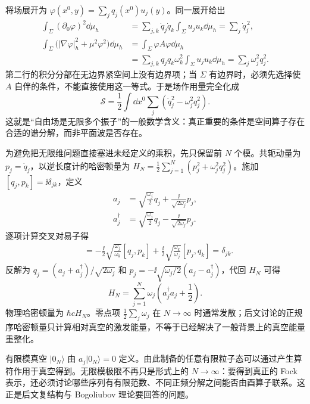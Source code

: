 将场展开为 $\varphi(x^0,y)=\sum_jq_j(x^0)u_j(y)$。同一展开给出
\begin{align*}
 \int_\Sigma(\partial_0\varphi)^2\dd\mu_h
 &=\sum_{j,k}\dot q_j\dot q_k\int_\Sigma u_ju_k\dd\mu_h
 =\sum_j\dot q_j^{\,2},\\
 \int_\Sigma\bigl(|\nabla\varphi|_h^2+\mu^2\varphi^2\bigr)\dd\mu_h
 &=\int_\Sigma\varphi A\varphi\dd\mu_h\\
 &=\sum_{j,k}q_jq_k\omega_k^2\int_\Sigma u_ju_k\dd\mu_h
 =\sum_j\omega_j^2q_j^2.
\end{align*}
第二行的积分分部在无边界紧空间上没有边界项；当 $\Sigma$ 有边界时，必须先选择使 $A$ 自伴的条件，不能直接使用这一等式。于是场作用量完全化成
\begin{equation}\label{eq:ghs-bridge-oscillator-action}
 \mathscr S=\frac12\int\dd x^0\sum_j(\dot q_j^2-\omega_j^2q_j^2).
\end{equation}
这就是“自由场是无限多个振子”的一般数学含义：真正重要的条件是空间算子存在合适的谱分解，而非平面波是否存在。



为避免把无限维问题直接塞进未经定义的乘积，先只保留前 $N$ 个模。共轭动量为 $p_j=\dot q_j$，以逆长度计的哈密顿量为 $H_N=\frac12\sum_{j=1}^{N}(p_j^2+\omega_j^2q_j^2)$。施加 $[q_j,p_k]=\ii\delta_{jk}$，定义
\begin{align*}
 a_j&=\sqrt{\frac{\omega_j}{2}}q_j+\frac{\ii}{\sqrt{2\omega_j}}p_j,\\
 a_j^\dagger&=\sqrt{\frac{\omega_j}{2}}q_j-\frac{\ii}{\sqrt{2\omega_j}}p_j.
\end{align*}
逐项计算交叉对易子得
\begin{align*}
 [a_j,a_k^\dagger]
 &=-\frac{\ii}{2}\sqrt{\frac{\omega_j}{\omega_k}}[q_j,p_k]
 +\frac{\ii}{2}\sqrt{\frac{\omega_k}{\omega_j}}[p_j,q_k]
 =\delta_{jk}.
\end{align*}
反解为 $q_j=(a_j+a_j^\dagger)/\sqrt{2\omega_j}$ 和
$p_j=-\ii\sqrt{\omega_j/2}(a_j-a_j^\dagger)$，代回 $H_N$ 可得
\[
 H_N=\sum_{j=1}^{N}\omega_j\left(a_j^\dagger a_j+\frac12\right).
\]
物理哈密顿量为 $\hbar cH_N$。零点项 $\frac12\sum_j\omega_j$ 在 $N\to\infty$ 时通常发散；后文讨论的正规序哈密顿量只计算相对真空的激发能量，不等于已经解决了一般背景上的真空能量重整化。



有限模真空 $|0_N\rangle$ 由 $a_j|0_N\rangle=0$ 定义。由此制备的任意有限粒子态可以通过产生算符作用于真空得到。无限模极限不再只是形式上的 $N\to\infty$：要得到真正的 Fock 表示，还必须讨论哪些序列有有限范数、不同正频分解之间能否由酉算子联系。这正是后文复结构与 Bogoliubov 理论要回答的问题。


